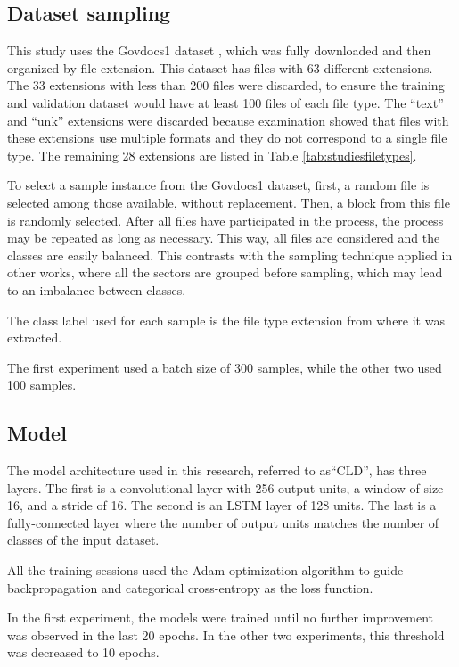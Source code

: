 \subsection{Dataset sampling}

This study uses the Govdocs1 dataset \cite{garfinkel_bringing_2009}, which was fully downloaded and then organized by file extension.
This dataset has files with 63 different extensions. The 33 extensions with less than 200 files were discarded, to ensure the training and validation dataset would have at least 100 files of each file type.
The  ``text'' and ``unk'' extensions were discarded because examination showed that files with these extensions use multiple formats and they do not correspond to a single file type.
The remaining 28 extensions are listed in Table \ref{tab:studiesfiletypes}.

To select a sample instance from the Govdocs1 dataset, first, a random file is selected among those available, without replacement. Then, a block from this file is randomly selected. After all files have participated in the process, the process may be repeated as long as necessary. This way, all files are considered and the classes are easily balanced.
This contrasts with the sampling technique applied in other works, where all the sectors are grouped before sampling, which may lead to an imbalance between classes.

The class label used for each sample is the file type extension from where it was extracted.

The first experiment used a batch size of 300 samples, while the other two used 100 samples.

\subsection{Model}
The model architecture used in this research, referred to as``CLD'', has three layers. The first is a convolutional layer with 256 output units, a window of size 16, and a stride of 16. The second is an LSTM layer of 128 units. The last is a fully-connected layer where the number of output units matches the number of classes of the input dataset.

All the training sessions used the Adam \cite{kingma_adam:_2014}
optimization algorithm to guide backpropagation and categorical cross-entropy as the loss function.

In the first experiment, the models were trained until no further improvement was observed in the last 20 epochs. In the other two experiments, this threshold was decreased to 10 epochs.

